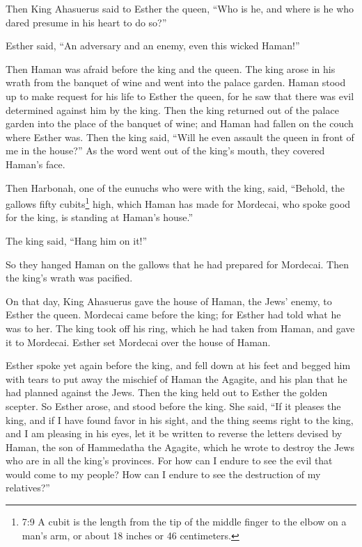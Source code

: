 \myverse{}Then King Ahasuerus said to Esther the queen, “Who is he, and where
is he who dared presume in his heart to do so?”

\myverse{}Esther said, “An adversary and an enemy, even this wicked Haman!”

Then Haman was afraid before the king and the queen.
\myverse{}The king arose in his wrath from the banquet of wine and went into the palace
garden. Haman stood up to make request for his life to Esther the queen, for he saw that there was evil
determined against him by the king.
\myverse{}Then the king returned out of the palace garden into the place of the banquet
of wine; and Haman had fallen on the couch where Esther was. Then the king said, “Will he even assault
the queen in front of me in the house?” As the word went out of the king’s mouth, they covered Haman’s
face.

\myverse{}Then Harbonah, one of the eunuchs who were with the king, said,
“Behold, the gallows fifty cubits\footnote{7:9 A cubit is the length from the tip of the middle finger to the elbow on a man’s arm, or about
	18 inches or 46 centimeters.} high, which Haman has made for Mordecai, who spoke good for the
king, is standing at Haman’s house.”

The king said, “Hang him on it!”

\myverse{}So they hanged Haman on the gallows that he had prepared for
Mordecai. Then the king’s wrath was pacified.


\mychapter{}\myverse*{}On that day, King Ahasuerus gave the house of Haman, the Jews’
enemy, to Esther the queen. Mordecai came before the king; for Esther had told what he was to her.
\myverse{}The king took off his ring, which he had taken from Haman, and gave it to Mordecai.
Esther set Mordecai over the house of Haman.

\myverse{}Esther spoke yet again before the king, and fell down at his feet
and begged him with tears to put away the mischief of Haman the Agagite, and his plan that he had planned
against the Jews.
\myverse{}Then the king held out to Esther the golden scepter. So Esther arose, and stood
before the king.
\myverse{}She said, “If it pleases the king, and if I have found favor in his sight, and
the thing seems right to the king, and I am pleasing in his eyes, let it be written to reverse the letters
devised by Haman, the son of Hammedatha the Agagite, which he wrote to destroy the Jews who are in all
the king’s provinces.
\myverse{}For how can I endure to see the evil that would come to my people? How can I
endure to see the destruction of my relatives?”

